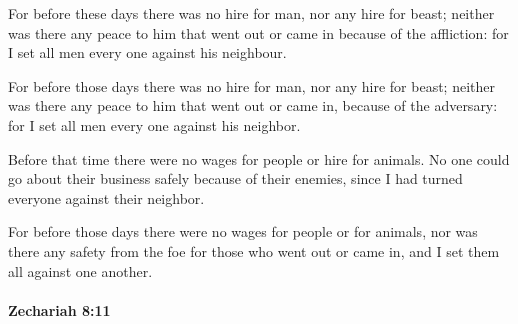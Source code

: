 			For before these days there was no hire for man, nor any hire for beast; neither was there any peace to him that went out or came in because of the affliction: for I set all men every one against his neighbour.

			\begin{versebox}
					\item[BHS] 
					\item[LXX] 
					\item[ASV] For before those days there was no hire for man, nor any hire for beast; neither was there any peace to him that went out or came in, because of the adversary: for I set all men every one against his neighbor.
					\item[NIV] Before that time there were no wages for people or hire for animals. No one could go about their business safely because of their enemies, since I had turned everyone against their neighbor.
					\item[NRSV] For before those days there were no wages for people or for animals, nor was there any safety from the foe for those who went out or came in, and I set them all against one another.
			\end{versebox}

		\paragraph{Zechariah 8:11} %
			\label{ZECHARIAH-8-11}

